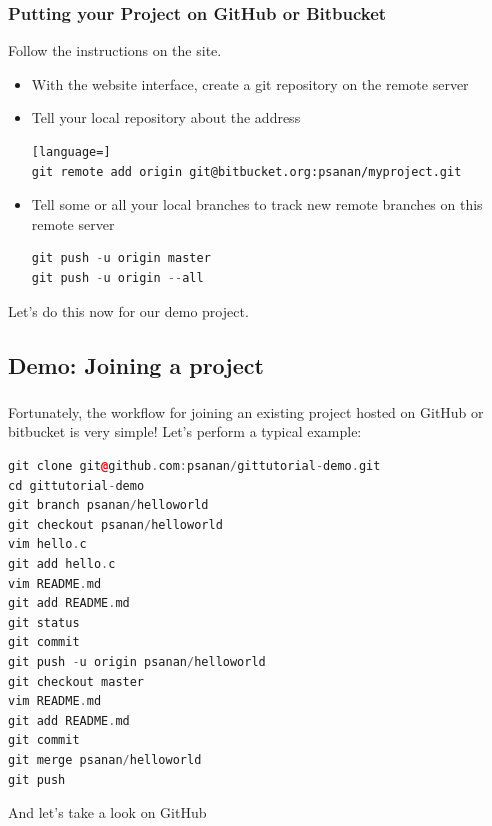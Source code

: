 \documentclass{beamer}
\begin{document}
\begin{frame}[fragile]
\frametitle{Putting your Project on GitHub or Bitbucket}
Follow the instructions on the site.
\begin{itemize}
\item With the website interface, create a git repository on the remote server
\item Tell your local repository about the address
\begin{lstlisting}[language=]
git remote add origin git@bitbucket.org:psanan/myproject.git
\end{lstlisting}
\item Tell some or all your local branches to track new remote branches on this remote server
\begin{lstlisting}[language=C++]
git push -u origin master
git push -u origin --all
\end{lstlisting}
\end{itemize}

Let's do this now for our demo project.

\end{frame}

\subsection{Demo: Joining a project}

\begin{frame}[fragile]
\frametitle{}
Fortunately, the workflow for joining an existing project hosted on GitHub or bitbucket is very simple!
Let's perform a typical example:
\begin{lstlisting}[language=C++]
git clone git@github.com:psanan/gittutorial-demo.git
cd gittutorial-demo
git branch psanan/helloworld
git checkout psanan/helloworld
vim hello.c
git add hello.c
vim README.md
git add README.md
git status
git commit
git push -u origin psanan/helloworld
git checkout master
vim README.md
git add README.md
git commit
git merge psanan/helloworld
git push
\end{lstlisting}
And let's take a look on GitHub
\end{frame}
\end{document}

